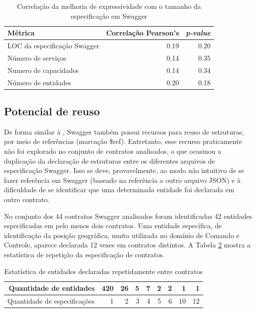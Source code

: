 % 
% 

\begin{table}[htb]
\caption{Correlação da melhoria de expressividade com o tamanho da especificação
em Swagger}
\begin{center}
\begin{tabular}{lrr} 
\toprule
Métrica & Correlação Pearson's & \emph{p-value} \\ \hline \hline 
LOC da especificação Swagger & 0.19 &  0.20 \\ 
Número de serviços & 0.14 & 0.35 \\ 
Numero de capacidades & 0.14 & 0.34 \\
Número de entidades & 0.20 & 0.18 \\ \bottomrule 
\end{tabular} 
\end{center}
\label{tab:size-corr}
\end{table}



\subsection{Potencial de reuso}

De forma similar à \neoidl{}, Swagger também possui recursos para reuso de
estruturas, por meio de referências (marcação \$ref). Entretanto, esse recurso
praticamente não foi explorado no conjunto de contratos analisados, o que
ocasinou a duplicação da declaração de estruturas entre os diferentes arquivos
de especificação Swagger. Isso se deve, provavelmente, ao modo não intuitivo de
se fazer referência em Swagger (baseado na referência a outro arquivo JSON) e à
dificuldade de se identificar que uma determinada entidade foi declarada em
outro contrato.

No conjunto dos 44 contratos Swagger analisados foram identificadas 42 entidades
especificadas em pelo menos dois contratos. Uma entidade específica, de
identificação da posição geográfica, muito utilizada no domínio de Comando e Controle, aparece
declarada 12 vezes em contratos distintos. A Tabela \ref{estatisticaEntidades}
mostra a estatística de repetição da especificação de contratos.
 
\begin{table}[!bth] 
\centering
\vspace{0.5cm}
\footnotesize
\begin{tabular}{|r|r|r|r|r|r|r|r|r|}
\hline   
Quantidade de entidades & 420 & 26 & 5 & 7 & 2 & 2 & 1 & 1 \\
\hline
Quantidade de especificações & 1 & 2 & 3 & 4 & 5 & 6 & 10 & 12 \\
\hline

\end{tabular}
\caption{Estatística de entidades declaradas repetidamente entre contratos}
\label{estatisticaEntidades}
\end{table}

